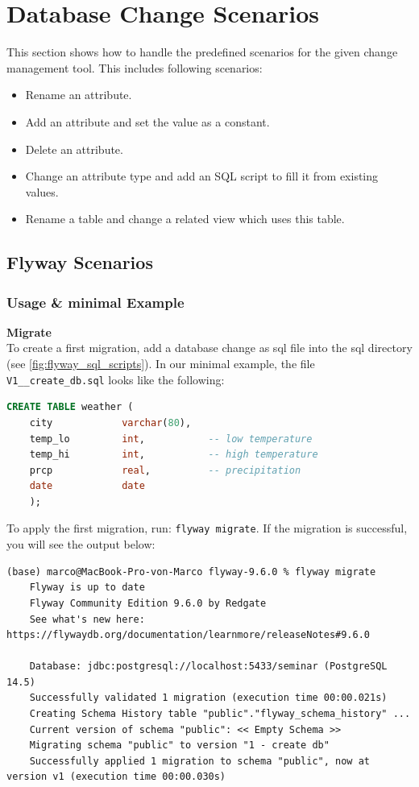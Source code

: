 

\chapter{Database Change Scenarios}
This section shows how to handle the predefined scenarios for the given change management tool. This includes following scenarios: 

\begin{itemize}
	\item Rename an attribute.
	\item Add an attribute and set the value as a constant.
	\item Delete an attribute.
	\item Change an attribute type and add an SQL script to fill it from existing values.
	\item Rename a table and change a related view which uses this table.
\end{itemize}


\section{Flyway Scenarios}

\subsection{Usage \& minimal Example}

%
\textbf{Migrate}\\
To create a first migration, add a database change as sql file into the sql directory (see \autoref{fig:flyway_sql_scripts}).
In our minimal example, the file \texttt{V1\_\_create\_db.sql} looks like the following:

\begin{lstlisting}[language=SQL, caption=Create a database]
	CREATE TABLE weather (
	city            varchar(80),
	temp_lo         int,           -- low temperature
	temp_hi         int,           -- high temperature
	prcp            real,          -- precipitation
	date            date
	);
\end{lstlisting}

To apply the first migration, run: \texttt{flyway migrate}.
If the migration is successful, you will see the output below:
\begin{lstlisting}[caption=Flyway first migration success]
	(base) marco@MacBook-Pro-von-Marco flyway-9.6.0 % flyway migrate
	Flyway is up to date
	Flyway Community Edition 9.6.0 by Redgate
	See what's new here: https://flywaydb.org/documentation/learnmore/releaseNotes#9.6.0
	
	Database: jdbc:postgresql://localhost:5433/seminar (PostgreSQL 14.5)
	Successfully validated 1 migration (execution time 00:00.021s)
	Creating Schema History table "public"."flyway_schema_history" ...
	Current version of schema "public": << Empty Schema >>
	Migrating schema "public" to version "1 - create db"
	Successfully applied 1 migration to schema "public", now at version v1 (execution time 00:00.030s)
\end{lstlisting}

